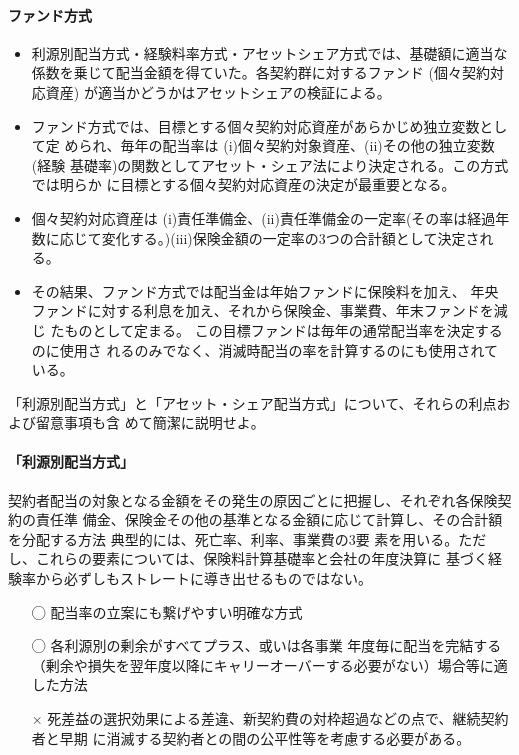 \documentclass[report,gutter=10mm,fore-edge=10mm,uplatex,dvipdfmx]{jlreq}
\begin{document}
\paragraph{ファンド方式}

\begin{itemize}
 \item 利源別配当方式・経験料率方式・アセットシェア方式では、基礎額に適当な係数を乗じて配当金額を得ていた。各契約群に対するファンド (個々契約対応資産) が適当かどうかはアセットシェアの検証による。
 \item ファンド方式では、目標とする個々契約対応資産があらかじめ独立変数として定
められ、毎年の配当率は
(i)個々契約対象資産、(ii)その他の独立変数(経験
基礎率)の関数としてアセット・シェア法により決定される。この方式では明らか
に目標とする個々契約対応資産の決定が最重要となる。
 \item 個々契約対応資産は
(i)責任準備金、(ii)責任準備金の一定率(その率は経過年数に応じて変化する。)(iii)保険金額の一定率の3つの合計額として決定される。
 \item その結果、ファンド方式では配当金は年始ファンドに保険料を加え、
年央ファンドに対する利息を加え、それから保険金、事業費、年末ファンドを減じ
たものとして定まる。
この目標ファンドは毎年の通常配当率を決定するのに使用さ
れるのみでなく、消滅時配当の率を計算するのにも使用されている。
\end{itemize}


「利源別配当方式」と「アセット・シェア配当方式」について、それらの利点および留意事項も含
めて簡潔に説明せよ。

\paragraph{「利源別配当方式」}
契約者配当の対象となる金額をその発生の原因ごとに把握し、それぞれ各保険契約の責任準
備金、保険金その他の基準となる金額に応じて計算し、その合計額を分配する方法
典型的には、死亡率、利率、事業費の3要
素を用いる。ただし、これらの要素については、保険料計算基礎率と会社の年度決算に
基づく経験率から必ずしもストレートに導き出せるものではない。
\begin{itemize}
 \item [◯] 配当率の立案にも繋げやすい明確な方式
 \item [◯] 各利源別の剰余がすべてプラス、或いは各事業
年度毎に配当を完結する（剰余や損失を翌年度以降にキャリーオーバーする必要がない）場合等に適した方法
 \item [×] 死差益の選択効果による差違、新契約費の対枠超過などの点で、継続契約者と早期
に消滅する契約者との間の公平性等を考慮する必要がある。
\end{itemize}
\end{document}
